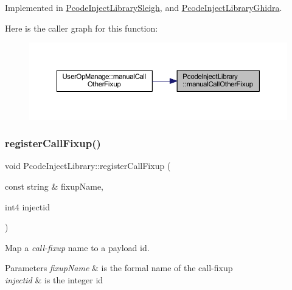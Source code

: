 Implemented in \mbox{\hyperlink{class_pcode_inject_library_sleigh_a5effe6ebe2d5b20644c2066d427283ae}{Pcode\+Inject\+Library\+Sleigh}}, and \mbox{\hyperlink{class_pcode_inject_library_ghidra_a1c38e037571239e59daa21c08f2a2bbb}{Pcode\+Inject\+Library\+Ghidra}}.

Here is the caller graph for this function\+:
\nopagebreak
\begin{figure}[H]
\begin{center}
\leavevmode
\includegraphics[width=350pt]{class_pcode_inject_library_a93f4e4b0f75d81b96bd92623d392269a_icgraph}
\end{center}
\end{figure}
\mbox{\label{class_pcode_inject_library_a2c6c5deb054a7ab6f8e59653ce9d984f}} 
\subsubsection{\texorpdfstring{registerCallFixup()}{registerCallFixup()}}
{\footnotesize\ttfamily void Pcode\+Inject\+Library\+::register\+Call\+Fixup (\begin{DoxyParamCaption}\item[{const string \&}]{fixup\+Name,  }\item[{int4}]{injectid }\end{DoxyParamCaption})\hspace{0.3cm}{\ttfamily [protected]}}



Map a {\itshape call-\/fixup} name to a payload id. 


\begin{DoxyParams}{Parameters}
{\em fixup\+Name} & is the formal name of the call-\/fixup \\
\hline
{\em injectid} & is the integer id \\
\hline
\end{DoxyParams}


